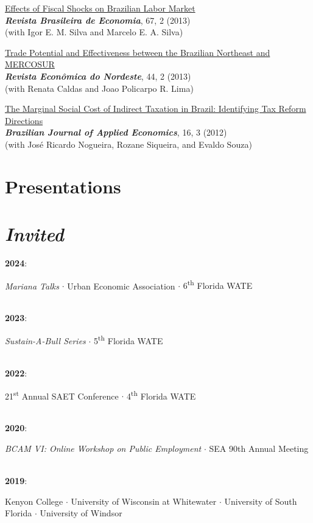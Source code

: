 \documentclass[mm, 10pt]{simple_style}
\begin{document}
\begin{resume}
\href{http://bibliotecadigital.fgv.br/ojs/index.php/rbe/article/view/3890}{Effects of Fiscal Shocks on Brazilian Labor Market} \\
\textbf{\textit{Revista Brasileira de Economia}}, 67, 2 (2013) \\
(with Igor E. M. Silva and Marcelo E. A. Silva) 

\href{https://www.bnb.gov.br/revista/index.php/ren/article/view/78/58}{Trade Potential and Effectiveness between the Brazilian Northeast and MERCOSUR} \\
\textbf{\textit{Revista Econ\^omica do Nordeste}}, 44, 2 (2013) \\
(with Renata Caldas and Joao Policarpo R. Lima) 

\href{https://www.scielo.br/scielo.php?pid=S1413-80502012000300001&script=sci_arttext}{The Marginal Social Cost of Indirect Taxation in Brazil: Identifying Tax Reform Directions} \\
\textbf{\textit{Brazilian Journal of Applied Economics}}, 16, 3 (2012) \\
(with Jos\'e Ricardo Nogueira, Rozane Siqueira, and Evaldo Souza)


\section{Presentations \\ {\protect\footnotesize {} \\ \emph{Invited}}}

\textbf{2024}: \begin{minipage}[t]{0.9\textwidth}
        \emph{Mariana Talks}
        $\cdot$ {Urban Economic Association} $\cdot$ {6\textsuperscript{th} Florida WATE}
        \end{minipage}\\
\textbf{2023}: \begin{minipage}[t]{0.9\textwidth}
        \emph{Sustain-A-Bull Series}
        $\cdot$ 5\textsuperscript{th} Florida WATE
        \end{minipage}\\
\textbf{2022}: \begin{minipage}[t]{0.9\textwidth}
        21\textsuperscript{st} Annual SAET Conference 
        $\cdot$ 4\textsuperscript{th} Florida WATE 
        \end{minipage}\\
\textbf{2020}: \begin{minipage}[t]{0.9\textwidth}
        \emph{BCAM VI: Online Workshop on Public Employment} $\cdot$ SEA 90th Annual Meeting
        \end{minipage}\\        
\textbf{2019}: \begin{minipage}[t]{0.9\textwidth}
        Kenyon College 
        $\cdot$ University of Wisconsin at Whitewater 
        $\cdot$ University of South Florida 
        $\cdot$ University of Windsor 
        \end{minipage}\\         



\end{resume}
\end{document}
